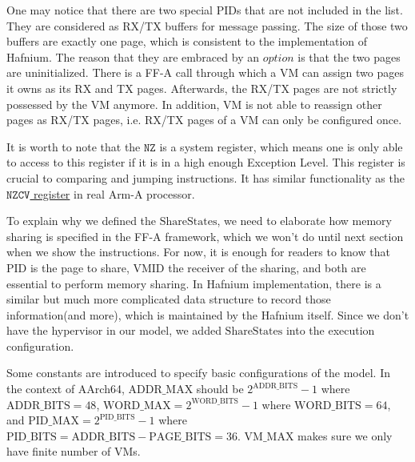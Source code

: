 \documentclass[a4paper]{article}
\newcommand*{\SSS}{\text{ShareStates}}
\newcommand*{\PID}{\text{PID}}
\newcommand*{\VMID}{\text{VMID}}
\newcommand*{\PABITS}{\text{ADDR\_BITS}}
\newcommand*{\PPBITS}{\text{PAGE\_BITS}}
\newcommand*{\PPIDBITS}{\text{PID\_BITS}}
\newcommand*{\PAMAX}{\text{ADDR\_MAX}}
\newcommand*{\PPIDMAX}{\text{PID\_MAX}}
\newcommand*{\PWBITS}{\text{WORD\_BITS}}
\newcommand*{\PWMAX}{\text{WORD\_MAX}}
\newcommand*{\PVMMAX}{\text{VM\_MAX}}
\begin{document}
One may notice that there are two special $\PID$s that are not included in the
list. They are considered as RX/TX buffers for message passing. The size of
those two buffers are exactly one page, which is consistent to the
implementation of Hafnium. The reason that they are embraced by an $option$ is
that the two pages are uninitialized. There is a FF-A call through which a VM
can assign two pages it owns as its RX and TX pages. Afterwards, the RX/TX pages
are not strictly possessed by the VM anymore. In addition, VM is not able to
reassign other pages as RX/TX pages, i.e. RX/TX pages of a VM can only be
configured once.

It is worth to note that the $\mathtt{NZ}$ is a system register, which means one
is only able to access to this register if it is in a high enough Exception
Level. This register is crucial to comparing and jumping instructions. It has
similar functionality as the
\href{https://developer.arm.com/docs/ddi0595/h/aarch64-system-registers/nzcv}
{$\mathtt{NZCV}$ register} in real Arm-A processor.



To explain why we defined the $\SSS$, we need to elaborate how memory sharing is
specified in the FF-A framework, which we won't do until next section when we
show the instructions. For now, it is enough for readers to know that $\PID$ is
the page to share, $\VMID$ the receiver of the sharing, and both are essential
to perform memory sharing. In Hafnium implementation, there is a similar but
much more complicated data structure to record those information(and more),
which is maintained by the Hafnium itself. Since we don't have the hypervisor in
our model, we added $\SSS$ into the execution configuration.

Some constants are introduced to specify basic configurations of the model. In
the context of AArch64, $\PAMAX$ should be $2^{\PABITS} - 1$ where
$\PABITS = 48$, $\PWMAX = 2^{\PWBITS} -1$ where $\PWBITS = 64$, and
$\PPIDMAX = 2^{\PPIDBITS}-1$ where $\PPIDBITS = \PABITS - \PPBITS = 36$.
$\PVMMAX$ makes sure we only have finite number of VMs.
\end{document}
